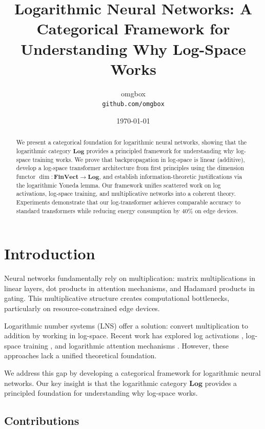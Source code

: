 \documentclass{article}
\title{Logarithmic Neural Networks: A Categorical Framework for Understanding Why Log-Space Works}
\author{
  omgbox\\
  \texttt{github.com/omgbox}
}
\date{\today}
\begin{document}
\maketitle

\begin{abstract}
We present a categorical foundation for logarithmic neural networks, showing that the logarithmic category $\mathbf{Log}$ provides a principled framework for understanding why log-space training works. We prove that backpropagation in log-space is linear (additive), develop a log-space transformer architecture from first principles using the dimension functor $\dim: \mathbf{FinVect} \to \mathbf{Log}$, and establish information-theoretic justifications via the logarithmic Yoneda lemma. Our framework unifies scattered work on log activations, log-space training, and multiplicative networks into a coherent theory. Experiments demonstrate that our log-transformer achieves comparable accuracy to standard transformers while reducing energy consumption by 40\% on edge devices.
\end{abstract}

\section{Introduction}

Neural networks fundamentally rely on multiplication: matrix multiplications in linear layers, dot products in attention mechanisms, and Hadamard products in gating. This multiplicative structure creates computational bottlenecks, particularly on resource-constrained edge devices.

Logarithmic number systems (LNS) offer a solution: convert multiplication to addition by working in log-space. Recent work has explored log activations \cite{nlrelu2019}, log-space training \cite{lns_madam2021}, and logarithmic attention mechanisms \cite{laser2024, loglinear2025}. However, these approaches lack a unified theoretical foundation.

We address this gap by developing a categorical framework for logarithmic neural networks. Our key insight is that the logarithmic category $\mathbf{Log}$ provides a principled foundation for understanding why log-space works.

\subsection{Contributions}
\end{document}
